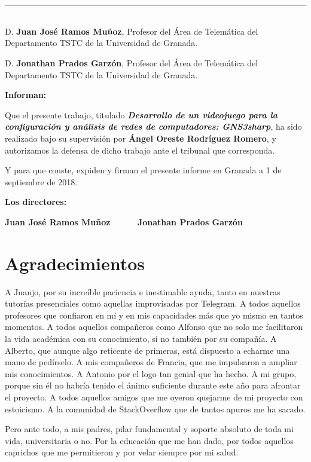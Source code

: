 \chapter*{}
\thispagestyle{empty}

\noindent\rule[-1ex]{\textwidth}{2pt}\\[4.5ex]

D. \textbf{Juan José Ramos Muñoz}, Profesor del Área de Telemática del Departamento TSTC de la Universidad de Granada.

\vspace{0.5cm}

D. \textbf{Jonathan Prados Garzón}, Profesor del Área de Telemática del Departamento TSTC de la Universidad de Granada.


\vspace{0.5cm}

\textbf{Informan:}

\vspace{0.5cm}

Que el presente trabajo, titulado \textit{\textbf{Desarrollo de un videojuego para la configuración y análisis de redes de computadores: GNS3sharp}},
ha sido realizado bajo su supervisión por \textbf{Ángel Oreste Rodríguez Romero}, y autorizamos la defensa de dicho trabajo ante el tribunal
que corresponda.

\vspace{0.5cm}

Y para que conste, expiden y firman el presente informe en Granada a 1 de septiembre de 2018.

\vspace{1cm}

\textbf{Los directores:}

\vspace{5cm}

\noindent \textbf{Juan José Ramos Muñoz \ \ \ \ \ Jonathan Prados Garzón}

\chapter*{Agradecimientos}
\thispagestyle{empty}

       \vspace{1cm}

A Juanjo, por su increíble paciencia e inestimable ayuda, tanto en nuestras tutorías presenciales como aquellas improvisadas por Telegram. A todos aquellos profesores que confiaron en mí y en mis capacidades más que yo mismo en tantos momentos. A todos aquellos compañeros como Alfonso que no solo me facilitaron la vida académica con su conocimiento, si no también por su compañía. A Alberto, que aunque algo reticente de primeras, está dispuesto a echarme una mano de pedírselo. A mis compañeros de Francia, que me impulsaron a ampliar mis conocimientos. A Antonio por el logo tan genial que ha hecho. A mi grupo, porque sin él no habría tenido el ánimo suficiente durante este año para afrontar el proyecto. A todos aquellos amigos que me oyeron quejarme de mi proyecto con estoicismo. A la comunidad de StackOverflow que de tantos apuros me ha sacado.

Pero ante todo, a mis padres, pilar fundamental y soporte absoluto de toda mi vida, universitaria o no. Por la educación que me han dado, por todos aquellos caprichos que me permitieron y por velar siempre por mi salud.